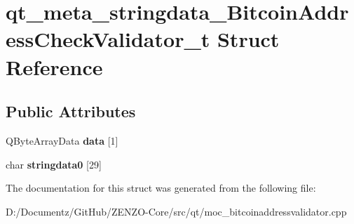 \hypertarget{structqt__meta__stringdata___bitcoin_address_check_validator__t}{}\section{qt\+\_\+meta\+\_\+stringdata\+\_\+\+Bitcoin\+Address\+Check\+Validator\+\_\+t Struct Reference}
\label{structqt__meta__stringdata___bitcoin_address_check_validator__t}
\subsection*{Public Attributes}
\begin{DoxyCompactItemize}
\item 
\mbox{\label{structqt__meta__stringdata___bitcoin_address_check_validator__t_a79c5bcf032c5dd9c3237807770da612d}} 
Q\+Byte\+Array\+Data {\bfseries data} \mbox{[}1\mbox{]}
\item 
\mbox{\label{structqt__meta__stringdata___bitcoin_address_check_validator__t_adea98d7e356f25ae1919b941ea5c3ba0}} 
char {\bfseries stringdata0} \mbox{[}29\mbox{]}
\end{DoxyCompactItemize}


The documentation for this struct was generated from the following file\+:\begin{DoxyCompactItemize}
\item 
D\+:/\+Documentz/\+Git\+Hub/\+Z\+E\+N\+Z\+O-\/\+Core/src/qt/moc\+\_\+bitcoinaddressvalidator.\+cpp\end{DoxyCompactItemize}
